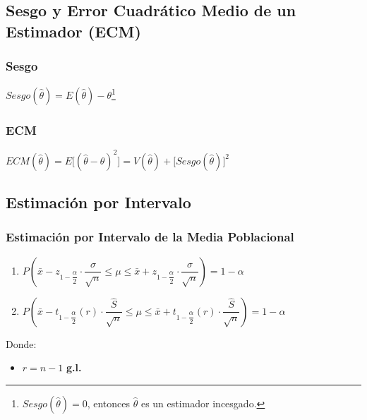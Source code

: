 \documentclass[10pt,letterpaper]{article}
\begin{document}
\subsection{Sesgo y Error Cuadrático Medio de un Estimador (ECM)}
\begin{multicols}{2}
\subsubsection*{Sesgo}
\begin{center}
$Sesgo(\hat{\theta})= E(\hat{\theta}) - \theta$\footnote{$Sesgo(\widehat{\theta})=0$, entonces $\widehat{\theta}$ es un estimador incesgado.}
\end{center}
\columnbreak
\subsubsection*{ECM}
\begin{center}
$ECM(\hat{\theta}) = E\big[ (\hat{\theta}-\theta)^2 \big]=V(\hat{\theta}) + \Big[ Sesgo(\hat{\theta})\Big]^2$
\end{center}
\end{multicols}
\subsection{Estimación por Intervalo}
\subsubsection{Estimación por Intervalo de la Media Poblacional}
\begin{enumerate}[label=(\roman*)]
  \item $P\left(\bar{x} - z_{1-\dfrac{\alpha}{2}}\cdot \dfrac{\sigma}{\sqrt{n}}\leq \mu \leq \bar{x} + z_{1-\dfrac{\alpha}{2}}\cdot \dfrac{\sigma}{\sqrt{n}} \right)=1-\alpha$
  \item $P\left(\bar{x} - t_{1-\dfrac{\alpha}{2}}(r)\cdot \dfrac{\widehat{S}}{\sqrt{n}}\leq \mu \leq \bar{x} + t_{1-\dfrac{\alpha}{2}}(r)\cdot \dfrac{\widehat{S}}{\sqrt{n}} \right)=1-\alpha$
\end{enumerate}
  Donde:
\begin{itemize}
\item $r=n-1$ \textbf{g.l.}
\end{itemize}
\end{document}
